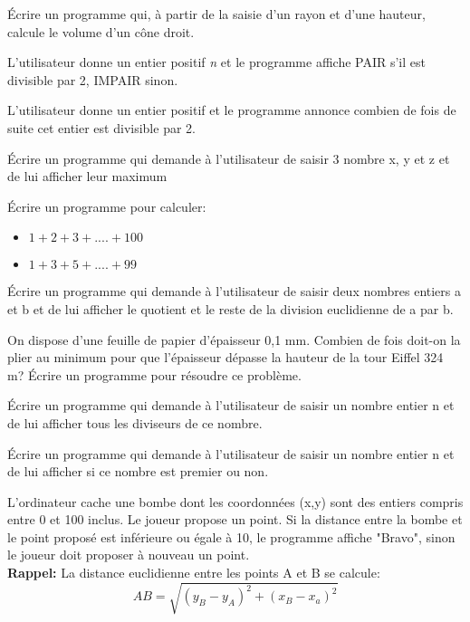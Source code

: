 \documentclass[a4paper,11pt]{article}
\begin{document}
\begin{exo}
Écrire un programme qui, à partir de la saisie d'un rayon et d'une hauteur, calcule le volume d'un cône droit.
\end{exo}
\begin{exo}
L'utilisateur donne un entier positif \emph{n} et le programme affiche PAIR s'il est divisible par 2, IMPAIR sinon.
\end{exo}
\begin{exo}
L'utilisateur donne un entier positif et le programme annonce combien de fois de suite cet entier est divisible par 2.
\end{exo}
\begin{exo}
Écrire un programme qui demande à l’utilisateur de saisir 3 nombre x, y et z et de lui afficher leur maximum
\end{exo}
\begin{exo}
Écrire un programme pour calculer:
\begin{itemize}
\item $1+2+3+....+100$
\item $1+3+5+....+99$
\end{itemize}
\end{exo}
\begin{exo}
Écrire un programme qui demande à l’utilisateur de saisir deux nombres entiers a et b et de lui afficher le quotient et le reste de la division euclidienne de a par b.
\end{exo}
\begin{exo}
On dispose d'une feuille de papier d'épaisseur 0,1 mm.
Combien de fois doit-on la plier au minimum pour que l'épaisseur dépasse la hauteur de la tour Eiffel 324 m?
Écrire un programme pour résoudre ce problème. 
\end{exo}
\begin{exo}
Écrire un programme qui demande à l’utilisateur de saisir un nombre entier n et de lui afficher tous les diviseurs de ce nombre.
\end{exo}
\begin{exo}
Écrire un programme qui demande à l’utilisateur de saisir un nombre entier n et de lui afficher si ce nombre est premier ou non.
\end{exo}
\begin{exo}
L'ordinateur cache une bombe dont les coordonnées (x,y) sont des entiers compris entre 0 et 100 inclus.
Le joueur propose un point. Si la distance entre la bombe et le point proposé est inférieure ou égale à 10, le programme affiche "Bravo", sinon le joueur doit proposer à nouveau un point.\\
\textbf{Rappel:} La distance euclidienne entre les points A et B se calcule:
$$AB = \sqrt{(y_B-y_A)^2+(x_B-x_a)^2}$$
\end{exo}
\end{document}
